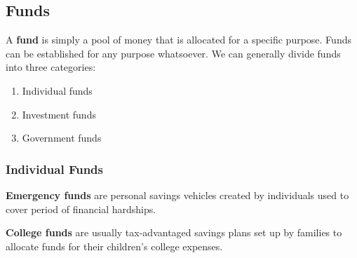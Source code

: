 \documentclass{article}
\begin{document}
  \subsection{Funds}

    \begin{definition}[Funds]
      A \textbf{fund} is simply a pool of money that is allocated for a specific purpose. Funds can be established for any purpose whatsoever. We can generally divide funds into three categories: 
      \begin{enumerate}
        \item Individual funds
        \item Investment funds
        \item Government funds
      \end{enumerate}
    \end{definition}

    \subsubsection{Individual Funds}

      \begin{definition}
        \textbf{Emergency funds} are personal savings vehicles created by individuals used to cover period of financial hardships. 
      \end{definition}

      \begin{definition}
        \textbf{College funds} are usually tax-advantaged savings plans set up by families to allocate funds for their children's college expenses. 
      \end{definition}
\end{document}
